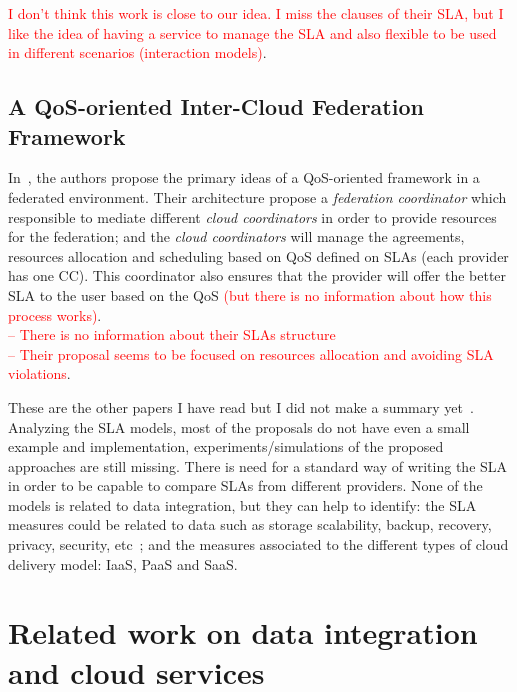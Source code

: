 \documentclass[12pt,a4paper,oneside]{article}
\begin{document}
\textcolor{red}{I don't think this work is close to our idea. I miss the clauses of their SLA, but I like the idea of having a service to manage the SLA and also flexible to be used in different scenarios (interaction models)}.

\subsection{A QoS-oriented Inter-Cloud Federation Framework}

In~\cite{054}, the authors propose the primary ideas of a QoS-oriented framework in a federated environment.  Their architecture propose a \textit{federation coordinator} which responsible to mediate different \textit{cloud coordinators} in order to provide resources for the federation; and the \textit{cloud coordinators} will manage the agreements, resources allocation and scheduling based on QoS defined on SLAs (each provider has one CC). This coordinator also ensures that the provider will offer the better SLA to the user based on the QoS \textcolor{red}{(but there is no information about how this process works)}.\\
\textcolor{red}{-- There is no information about their SLAs structure \\
--  Their proposal seems to be focused on resources allocation and avoiding SLA violations}.

\bigskip These are the other papers I have read but I did not make a summary yet~\cite{BernsmedJU11,025}.
Analyzing the SLA models, most of the proposals do not have even a small example and implementation, experiments/simulations of the proposed approaches are still missing. There is need for a standard way of writing the SLA in order to be capable to compare SLAs from different providers. None of the models is related to data integration, but they can help to identify: the SLA measures could be related to data such as storage scalability, backup, recovery, privacy, security, etc~\cite{005}; and the measures associated to the different types of cloud delivery model: IaaS, PaaS and SaaS.




\section{Related work on data integration and cloud services}
\end{document}
